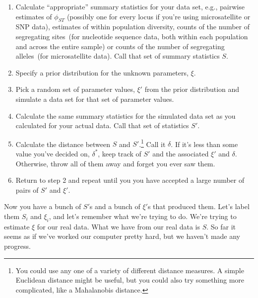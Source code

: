 \begin{enumerate}

\item Calculate ``appropriate'' summary statistics for your data set,
  e.g., pairwise estimates of $\phi_{ST}$ (possibly one for every
  locus if you're using microsatellite or SNP data), estimates of
  within population diversity, counts of the number of segregating
  sites~(for nucleotide sequence data, both within each population and
  across the entire sample) or counts of the number of segregating
  alleles~(for microsatellite data). Call that set of summary
  statistics $S$.

\item Specify a prior distribution for the unknown parameters, $\xi$.

\item Pick a random set of parameter values, $\xi'$ from the prior
  distribution and simulate a data set for that set of parameter
  values.

\item Calculate the same summary statistics for the simulated
  data set as you calculated for your actual data. Call that set of
  statistics $S'$. 

\item Calculate the distance between $S$ and $S'$.\footnote{You could
    use any one of a variety of different distance measures. A simple
    Euclidean distance might be useful, but you could also try
    something more complicated, like a Mahalanobis distance.} Call it
  $\delta$. If it's less than some value you've decided on,
  $\delta^*$, keep track of $S'$ and the associated $\xi'$ and
  $\delta$. Otherwise, throw all of them away and forget you ever saw
  them.

\item Return to step 2 and repeat until you you have accepted a large
  number of pairs of $S'$ and $\xi'$.

\end{enumerate}

Now you have a bunch of $S'$s and a bunch of $\xi'$s that produced
them. Let's label them $S_i$ and $\xi_i$, and let's remember what
we're trying to do. We're trying to estimate $\xi$ for our real
data. What we have from our real data is $S$. So far it seems as if
we've worked our computer pretty hard, but we haven't made any
progress. 

